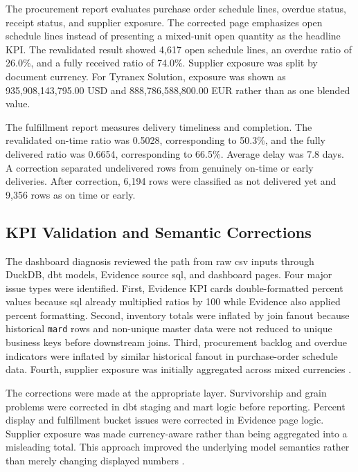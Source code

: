 The procurement report evaluates purchase order schedule lines, overdue status, receipt status, and supplier exposure. The corrected page emphasizes open schedule lines instead of presenting a mixed-unit open quantity as the headline KPI. The revalidated result showed 4,617 open schedule lines, an overdue ratio of 26.0\%, and a fully received ratio of 74.0\%. Supplier exposure was split by document currency. For Tyranex Solution, exposure was shown as 935,908,143,795.00 USD and 888,786,588,800.00 EUR rather than as one blended value.

The fulfillment report measures delivery timeliness and completion. The revalidated on-time ratio was 0.5028, corresponding to 50.3\%, and the fully delivered ratio was 0.6654, corresponding to 66.5\%. Average delay was 7.8 days. A correction separated undelivered rows from genuinely on-time or early deliveries. After correction, 6,194 rows were classified as not delivered yet and 9,356 rows as on time or early.

\subsection{KPI Validation and Semantic Corrections}

The dashboard diagnosis reviewed the path from raw \ac{csv} inputs through DuckDB, \ac{dbt} models, Evidence source \ac{sql}, and dashboard pages. Four major issue types were identified. First, Evidence KPI cards double-formatted percent values because \ac{sql} already multiplied ratios by 100 while Evidence also applied percent formatting. Second, inventory totals were inflated by join fanout because historical \texttt{mard} rows and non-unique master data were not reduced to unique business keys before downstream joins. Third, procurement backlog and overdue indicators were inflated by similar historical fanout in purchase-order schedule data. Fourth, supplier exposure was initially aggregated across mixed currencies \parencite{yair_wand_anchoring_1996}.

The corrections were made at the appropriate layer. Survivorship and grain problems were corrected in \ac{dbt} staging and mart logic before reporting. Percent display and fulfillment bucket issues were corrected in Evidence page logic. Supplier exposure was made currency-aware rather than being aggregated into a misleading total. This approach improved the underlying model semantics rather than merely changing displayed numbers \parencite{yair_wand_anchoring_1996,wang_beyond_1996}.

